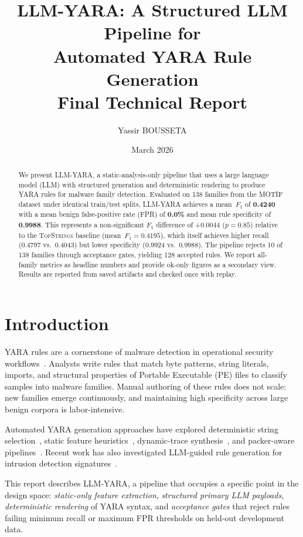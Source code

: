 \documentclass[10pt,twocolumn]{article}
\title{\textbf{LLM-YARA: A Structured LLM Pipeline for\\
Automated YARA Rule Generation}\\[4pt]
\large Final Technical Report}
\author{%
  Yassir BOUSSETA
}
\date{March 2026}
\newcommand{\sysname}{\textsc{LLM-YARA}\xspace}
\newcommand{\topstrings}{\textsc{TopStrings}\xspace}
\newcommand{\motif}{\textsc{MOTIF}\xspace}
\begin{document}
\maketitle
\thispagestyle{empty}

\begin{abstract}
We present \sysname, a static-analysis-only pipeline that uses a
large language model (LLM) with structured generation and
deterministic rendering to produce YARA rules for malware family
detection.  Evaluated on 138 families from the \motif dataset under
identical train/test splits, \sysname achieves a mean~$F_1$ of
\textbf{0.4240} with a mean benign false-positive rate (FPR) of
\textbf{0.0\%} and mean rule specificity of \textbf{0.9988}.  This
represents a non-significant $F_1$ difference of $+0.0044$ ($p=0.85$)
relative to the \topstrings baseline (mean~$F_1=0.4195$), which
itself achieves higher recall (0.4797 vs.\ 0.4043) but lower
specificity (0.9924 vs.\ 0.9988).  The pipeline rejects 10 of 138
families through acceptance gates, yielding 128 accepted rules.  We
report all-family metrics as headline numbers and provide ok-only
figures as a secondary view.  Results are reported from saved
artifacts and checked once with replay.
\end{abstract}

\section{Introduction}
\label{sec:intro}

YARA rules are a cornerstone of malware detection in operational
security workflows~\cite{yara2024}.  Analysts write rules that match
byte patterns, string literals, imports, and structural properties of
Portable Executable (PE) files to classify samples into malware
families.  Manual authoring of these rules does not scale: new families
emerge continuously, and maintaining high specificity across large
benign corpora is labor-intensive.

Automated YARA generation approaches have explored deterministic
string selection~\cite{autoyara2020}, static feature
heuristics~\cite{apiary2023ccs}, dynamic-trace
synthesis~\cite{yamme2023}, and packer-aware
pipelines~\cite{packgenome2023ccs}.  Recent work has also investigated
LLM-guided rule generation for intrusion detection
signatures~\cite{rulellm2025}.

This report describes \sysname, a pipeline that occupies a specific
point in the design space: \emph{static-only feature extraction},
\emph{structured primary LLM payloads},
\emph{deterministic rendering} of YARA syntax, and
\emph{acceptance gates} that reject rules failing minimum recall or
maximum FPR thresholds on held-out development data.
\end{document}
